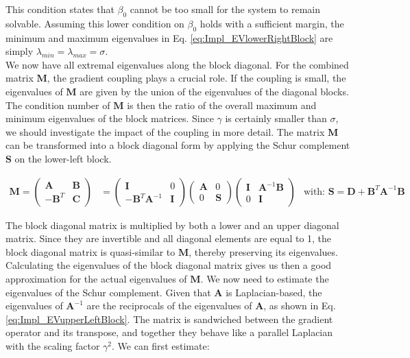 This condition states that $\beta_0$ cannot be too small for the system to remain solvable. Assuming this lower condition on $\beta_0$ holds with a sufficient margin, the minimum and maximum eigenvalues in Eq. \ref{eq:Impl_EVlowerRightBlock} are simply $\lambda_{min} = \lambda_{max} = \sigma$. \\

We now have all extremal eigenvalues along the block diagonal. For the combined matrix $\mathbf{M}$, the gradient coupling plays a crucial role. If the coupling is small, the eigenvalues of $\mathbf{M}$ are given by the union of the eigenvalues of the diagonal blocks. The condition number of $\mathbf{M}$ is then the ratio of the overall maximum and minimum eigenvalues of the block matrices. Since $\gamma$ is certainly smaller than $\sigma$, we should investigate the impact of the coupling in more detail. The matrix $\mathbf{M}$ can be transformed into a block diagonal form by applying the Schur complement $\mathbf{S}$ on the lower-left block.


\begin{align}
	\textbf{M} = \begin{pmatrix}
		\textbf{A} & \textbf{B} \\ -\textbf{B}^T & \textbf{C} 
	\end{pmatrix} &= \begin{pmatrix}
		\textbf{I} & 0 \\ -\textbf{B}^T\textbf{A}^{-1} & \textbf{I}
	\end{pmatrix}\begin{pmatrix}
		\textbf{A} & 0 \\ 0 & \textbf{S}
	\end{pmatrix}\begin{pmatrix}
		\textbf{I} & \textbf{A}^{-1}\textbf{B} \\ 0 & \textbf{I}
	\end{pmatrix} & \text{with: } 
	\textbf{S} = \textbf{D} + \textbf{B}^T \textbf{A}^{-1}\textbf{B}
\end{align}


The block diagonal matrix is multiplied by both a lower and an upper diagonal matrix. Since they are invertible and all diagonal elements are equal to 1, the block diagonal matrix is quasi-similar to $\textbf{M}$\cite{gallier2010schur}, thereby preserving its eigenvalues. Calculating the eigenvalues of the block diagonal matrix gives us then a good approximation for the actual eigenvalues of $\textbf{M}$. We now need to estimate the eigenvalues of the Schur complement. Given that $\textbf{A}$ is Laplacian-based, the eigenvalues of $\textbf{A}^{-1}$ are the reciprocals of the eigenvalues of $\textbf{A}$, as shown in Eq. \ref{eq:Impl_EVupperLeftBlock}. The matrix is sandwiched between the gradient operator and its transpose, and together they behave like a parallel Laplacian with the scaling factor $\gamma^2$. We can first estimate:

